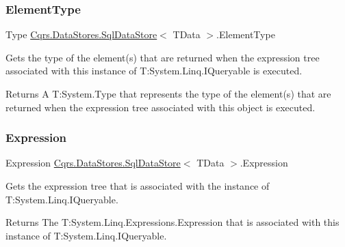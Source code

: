 \subsubsection{\texorpdfstring{Element\+Type}{ElementType}}
{\footnotesize\ttfamily Type \hyperlink{classCqrs_1_1DataStores_1_1SqlDataStore}{Cqrs.\+Data\+Stores.\+Sql\+Data\+Store}$<$ T\+Data $>$.Element\+Type\hspace{0.3cm}{\ttfamily [get]}}



Gets the type of the element(s) that are returned when the expression tree associated with this instance of T\+:\+System.\+Linq.\+I\+Queryable is executed. 

\begin{DoxyReturn}{Returns}
A T\+:\+System.\+Type that represents the type of the element(s) that are returned when the expression tree associated with this object is executed. 
\end{DoxyReturn}
\mbox{\label{classCqrs_1_1DataStores_1_1SqlDataStore_a1fb28f14cf7762331ec9e7d5efe19c75}} 
\subsubsection{\texorpdfstring{Expression}{Expression}}
{\footnotesize\ttfamily Expression \hyperlink{classCqrs_1_1DataStores_1_1SqlDataStore}{Cqrs.\+Data\+Stores.\+Sql\+Data\+Store}$<$ T\+Data $>$.Expression\hspace{0.3cm}{\ttfamily [get]}}



Gets the expression tree that is associated with the instance of T\+:\+System.\+Linq.\+I\+Queryable. 

\begin{DoxyReturn}{Returns}
The T\+:\+System.\+Linq.\+Expressions.\+Expression that is associated with this instance of T\+:\+System.\+Linq.\+I\+Queryable. 
\end{DoxyReturn}
\mbox{\label{classCqrs_1_1DataStores_1_1SqlDataStore_a44cd63b587e42b278177070eab8404f7}} 
